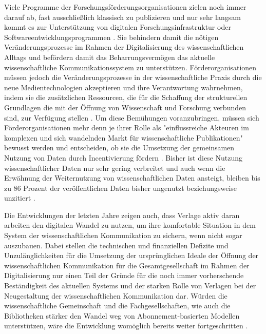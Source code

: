 Viele Programme der Forschungsförderungsorganisationen zielen noch immer darauf ab, fast ausschließlich klassisch zu publizieren und nur sehr langsam kommt es zur Unterstützung von digitalen Forschungsinfrastruktur oder Softwareentwicklungsprogrammen \cite{hey_2015_open}. Sie behindern damit die nötigen Veränderungsprozesse im Rahmen der Digitalisierung des wissenschaftlichen Alltags und befördern damit das Beharrungsvermögen das aktuelle wissenschaftliche  Kommunikationssystem zu unterstützen. Förderorganisationen müssen jedoch die Veränderungsprozesse in der wissenschaftliche Praxis durch die neue Medientechnologien akzeptieren und ihre Verantwortung wahrnehmen, indem sie die zusätzlichen Ressourcen, die für die Schaffung der strukturellen Grundlagen die mit der Öffnung von Wissenschaft und Forschung verbunden sind, zur Verfügung stellen \cite{mennes_2013_making_os} \cite{patlak_2010_open}. Um diese Bemühungen voranzubringen, müssen sich Förderorganisationen mehr denn je ihrer Rolle als "einflussreiche  Akteuren  im  komplexen und  sich  wandelnden  Markt  für  wissenschaftliche  Publikationen" \cite{wein_2010_erwerbung} bewusst werden und entscheiden, ob sie die Umsetzung der gemeinsamen Nutzung von Daten durch Incentivierung fördern \cite{mennes_2013_making_os}. Bisher ist diese Nutzung wissenschaftlicher Daten nur sehr gering verbreitet und auch wenn die Erwähnung der Weiternutzung von wissenschaftlichen Daten ansteigt, bleiben bis zu 86 Prozent der veröffentlichen Daten bisher ungenutzt beziehungsweise unzitiert \cite{peters_2015_research}.

Die Entwicklungen der letzten Jahre zeigen auch, dass Verlage aktiv daran arbeiten den digitalen Wandel zu nutzen, um ihre komfortable Situation in dem System der wissenschaftlichen Kommunikation zu sichern, wenn nicht sogar auszubauen. Dabei stellen die technischen und finanziellen Defizite und Unzulänglichkeiten für die Umsetzung der ursprünglichen Ideale der Öffnung der wissenschaftlichen Kommunikation für die Gesamtgesellschaft im Rahmen der Digitalisierung nur einen Teil der Gründe für die noch immer vorherschende Beständigkeit des aktuellen Systems und der starken Rolle von Verlagen bei der Neugestaltung der wissenschaftlichen Kommunikation dar. Würden die wissenschaftliche Gemeinschaft und die Fachgesellschaften, wie auch die Bibliotheken stärker den Wandel weg von Abonnement-basierten Modellen unterstützen, wäre die Entwicklung womöglich bereits weiter fortgeschritten \cite{nosek_2012_scientific}.

